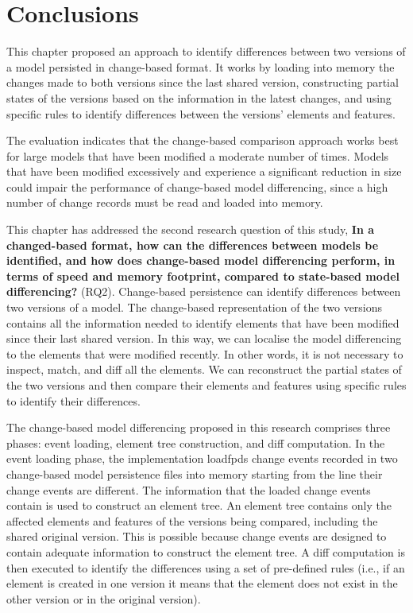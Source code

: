 \section{Conclusions}
\label{sec:conclusions_6}
This chapter proposed an approach to identify differences between two versions of a model persisted in change-based format. It works by loading into memory the changes made to both versions since the last shared version, constructing partial states of the versions based on the information in the latest changes, and using specific rules to identify differences between the versions’ elements and features.

The evaluation indicates that the change-based comparison approach works best for large models that have been modified a moderate number of times. Models that have been modified excessively and experience a significant reduction in size could impair the performance of change-based model differencing, since a high number of change records must be read and loaded into memory.

This chapter has addressed the second research question of this study, \textbf{In a changed-based format, how can the differences between models be identified, and how does change-based model differencing perform, in terms of speed and memory footprint, compared to state-based model differencing?} (RQ2). Change-based persistence can identify differences between two versions of a model. The change-based representation of the two versions contains all the information needed to identify elements that have been modified since their last shared version. In this way, we can localise the model differencing to the elements that were modified recently. In other words, it is not necessary to inspect, match, and diff all the elements. We can reconstruct the partial states of the two versions and then compare their elements and features using specific rules to identify their differences.

The change-based model differencing proposed in this research comprises three phases: event loading, element tree construction, and diff computation. In the event loading phase, the implementation loadfpds change events recorded in two change-based model persistence files into memory starting from the line their change events are different. The information that the loaded change events contain is used to construct an element tree. An element tree contains only the affected elements and features of the versions being compared, including the shared original version. This is possible because change events are designed to contain adequate information to construct the element tree. A diff computation is then executed to identify the differences using a set of pre-defined rules (i.e., if an element is created in one version it means that the element does not exist in the other version or in the original version).


